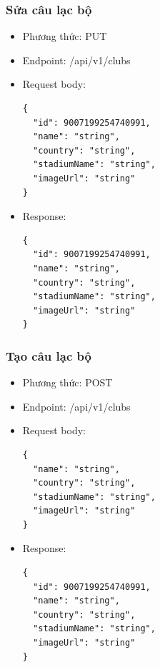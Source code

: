 \documentclass[../BTL.tex]{subfiles}
\begin{document}
\subsubsection{ Sửa câu lạc bộ}
\begin{itemize}
    \item Phương thức: PUT
    \item Endpoint: /api/v1/clubs
    \item Request body:
        \begin{verbatim}
{
  "id": 9007199254740991,
  "name": "string",
  "country": "string",
  "stadiumName": "string",
  "imageUrl": "string"
}
        \end{verbatim}
    \item Response:
        \begin{verbatim}
{
  "id": 9007199254740991,
  "name": "string",
  "country": "string",
  "stadiumName": "string",
  "imageUrl": "string"
}
        \end{verbatim}
\end{itemize}

\subsubsection{ Tạo câu lạc bộ}
\begin{itemize}
    \item Phương thức: POST
    \item Endpoint: /api/v1/clubs
    \item Request body:
        \begin{verbatim}
{
  "name": "string",
  "country": "string",
  "stadiumName": "string",
  "imageUrl": "string"
}
        \end{verbatim}
    \item Response:
        \begin{verbatim}
{
  "id": 9007199254740991,
  "name": "string",
  "country": "string",
  "stadiumName": "string",
  "imageUrl": "string"
}
        \end{verbatim}
\end{itemize}
\end{document}
